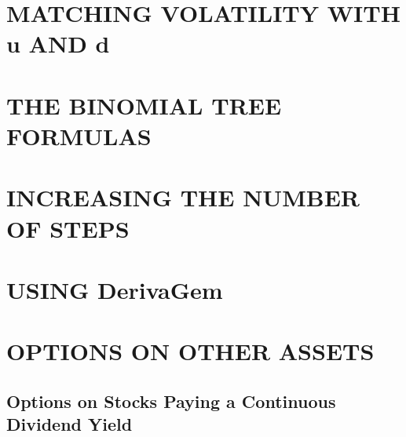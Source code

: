 \documentclass{article}
\begin{document}
\section{MATCHING VOLATILITY WITH u AND d}

\section{THE BINOMIAL TREE FORMULAS}

\section{INCREASING THE NUMBER OF STEPS}

\section{USING DerivaGem}

\section{OPTIONS ON OTHER ASSETS}

\subsection{Options on Stocks Paying a Continuous Dividend Yield}
\end{document}
